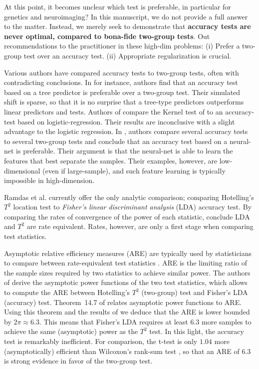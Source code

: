 \documentclass[journal]{IEEEtran}
\begin{document}
At this point, it becomes unclear which test is preferable, in particular for genetics and neuroimaging?
In this manuscript, we do not provide a full answer to the matter.
Instead, we merely seek to demonstrate that \textbf{accuracy tests are never optimal, compared to bona-fide two-group tests}.
Out recommendations to the practitioner in these high-dim problems:
(i) Prefer a two-group test over an accuracy test. 
(ii) Appropriate regularization is crucial. 

Various authors have compared accuracy tests to two-group tests, often with contradicting conclusions.
In \cite{yu2007two} for instance, authors find that an accuracy test based on a tree predictor is preferable over a two-group test. 
Their simulated shift is sparse, so that it is no surprise that a tree-type predictors outperforms linear predictors and tests. 
Authors of \cite{olivetti2013kernel} compare the Kernel test of \cite{gretton_kernel_2012-1} to an accuracy-test based on logistic-regression.
Their results are inconclusive with a slight advantage to the logistic regression.
In \cite{lopez2016revisiting}, authors compare several accuracy tests to several two-group tests and conclude that an accuracy test based on a neural-net is preferable. 
Their argument is that the neural-net is able to learn the features that best separate the samples. Their examples, however, are low-dimensional (even if large-sample), and such feature learning is typically impossible in high-dimension.

Ramdas et al. \cite{ramdas_classification_2016} currently offer the only analytic comparison; comparing Hotelling's $T^2$ location test to \emph{Fisher's linear discriminant analysis} (LDA) accuracy test. 
By comparing the rates of convergence of the power of each statistic, \cite{ramdas_classification_2016} conclude LDA and $T^2$ are rate equivalent. 
Rates, however, are only a first stage when comparing test statistics. 

Asymptotic relative efficiency measures (ARE) are typically used by statisticians to compare between rate-equivalent test statistics \cite{vaart_asymptotic_1998}.
ARE is the limiting ratio of the sample sizes required by two statistics to achieve similar power. 
The authors of \cite{ramdas_classification_2016} derive the asymptotic power functions of the two test statistics, which allows to compute the ARE between Hotelling's $T^2$ (two-group) test and Fisher's LDA (accuracy) test.
Theorem~14.7 of \cite{vaart_asymptotic_1998} relates asymptotic power functions to ARE.
Using this theorem and the results of \cite{ramdas_classification_2016} we deduce that the ARE is lower bounded by $2 \pi \approx 6.3$. 
This means that Fisher's LDA requires at least $6.3$ more samples to achieve the same (asymptotic) power as the $T^2$ test. 
In this light, the accuracy test is remarkably inefficient.  
For comparison, the t-test is only $1.04$ more (asymptotically) efficient than Wilcoxon's rank-sum test \cite{lehmann_parametric_2009}, so that an ARE of $6.3$ is strong evidence in favor of the two-group test. 
\end{document}
